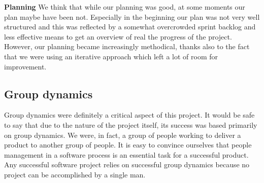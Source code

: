 \textbf{Planning}\newline
We think that while our planning was good, at some moments our plan maybe have been not.
Especially in the beginning our plan was not very well structured and this was reflected
by a somewhat overcrowded sprint backlog and less effective means to get an overview
of real the progress of the project. However, our planning became increasingly
methodical, thanks also to the fact that we were using an iterative approach which
left a lot of room for improvement.%

\subsection{Group dynamics}
\label{sec:group}

Group dynamics were definitely a critical aspect of this project.
It would be safe to say that due to the nature of the project itself, its success was based primarily on group dynamics.
We were, in fact, a group of people working to deliver a product to another group of people.
It is easy to convince ourselves that people management in a software process is an essential task for a successful product.
Any successful software project relies on successful group dynamics because no project can be
accomplished by a single man.%

